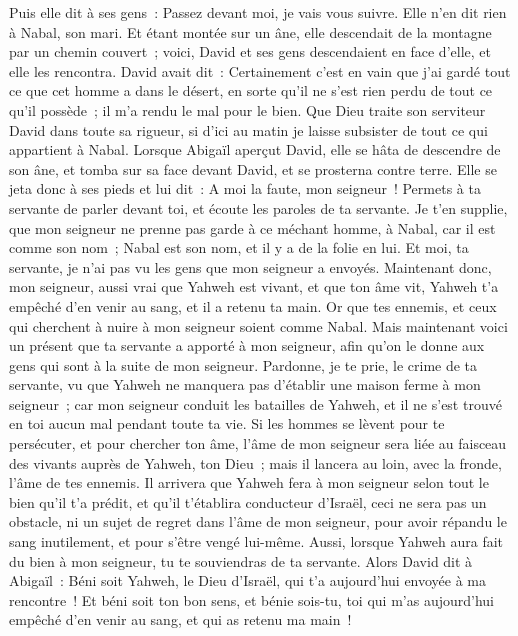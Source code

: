 \begin{multicols}{2}
Puis elle dit à ses gens~: Passez devant moi, je vais vous suivre. Elle n'en dit rien à Nabal, son mari.
Et étant montée sur un âne, elle descendait de la montagne par un chemin couvert~; voici, David et ses gens descendaient en face d'elle, et elle les rencontra.
David avait dit~: Certainement c'est en vain que j'ai gardé tout ce que cet homme a dans le désert, en sorte qu'il ne s'est rien perdu de tout ce qu'il possède~; il m'a rendu le mal pour le bien.
Que Dieu traite son serviteur David dans toute sa rigueur, si d'ici au matin je laisse subsister de tout ce qui appartient à Nabal.
Lorsque Abigaïl aperçut David, elle se hâta de descendre de son âne, et tomba sur sa face devant David, et se prosterna contre terre.
Elle se jeta donc à ses pieds et lui dit~: A moi la faute, mon seigneur~! Permets à ta servante de parler devant toi, et écoute les paroles de ta servante.
Je t'en supplie, que mon seigneur ne prenne pas garde à ce méchant homme, à Nabal, car il est comme son nom~; Nabal est son nom, et il y a de la folie en lui. Et moi, ta servante, je n'ai pas vu les gens que mon seigneur a envoyés.
Maintenant donc, mon seigneur, aussi vrai que Yahweh est vivant, et que ton âme vit, Yahweh t'a empêché d'en venir au sang, et il a retenu ta main. Or que tes ennemis, et ceux qui cherchent à nuire à mon seigneur soient comme Nabal.
Mais maintenant voici un présent que ta servante a apporté à mon seigneur, afin qu'on le donne aux gens qui sont à la suite de mon seigneur.
Pardonne, je te prie, le crime de ta servante, vu que Yahweh ne manquera pas d'établir une maison ferme à mon seigneur~; car mon seigneur conduit les batailles de Yahweh, et il ne s'est trouvé en toi aucun mal pendant toute ta vie.
Si les hommes se lèvent pour te persécuter, et pour chercher ton âme, l'âme de mon seigneur sera liée au faisceau des vivants auprès de Yahweh, ton Dieu~; mais il lancera au loin, avec la fronde, l'âme de tes ennemis.
Il arrivera que Yahweh fera à mon seigneur selon tout le bien qu'il t'a prédit, et qu'il t'établira conducteur d'Israël,
ceci ne sera pas un obstacle, ni un sujet de regret dans l'âme de mon seigneur, pour avoir répandu le sang inutilement, et pour s'être vengé lui-même. Aussi, lorsque Yahweh aura fait du bien à mon seigneur, tu te souviendras de ta servante.
Alors David dit à Abigaïl~: Béni soit Yahweh, le Dieu d'Israël, qui t'a aujourd'hui envoyée à ma rencontre~!
Et béni soit ton bon sens, et bénie sois-tu, toi qui m'as aujourd'hui empêché d'en venir au sang, et qui as retenu ma main~!

\end{multicols}
